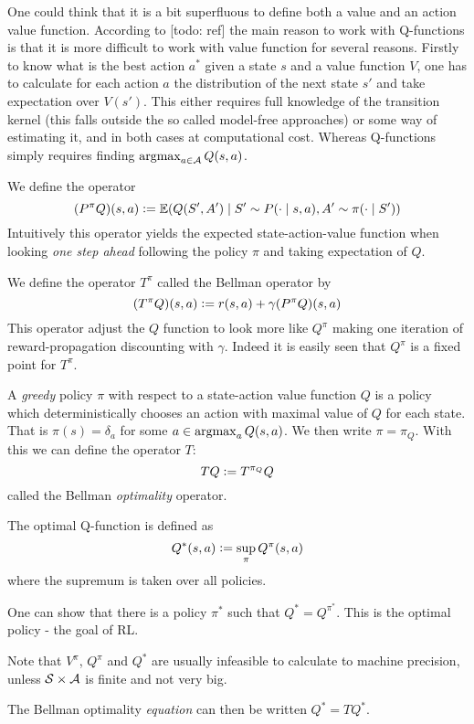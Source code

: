 One could think that it is a bit superfluous to define both a value and an
action value function. 
According to [todo: ref] the main reason to work with Q-functions
is that it is more difficult to work with value function for several reasons.
Firstly to know what is the best action $a^*$ given a state $s$
and a value function $V$, one has to calculate for each action $a$
the distribution of the next state $s'$ and take expectation over
$V(s')$. This either requires full knowledge of the transition kernel
(this falls outside the so called model-free approaches)
or some way of estimating it, and in both cases at computational cost.
Whereas Q-functions simply requires finding
$\operatorname*{argmax}_{a \in \mathcal{A}} Q(s,a)$.

We define the operator
\[ (P^\pi Q)(s, a) \vcentcolon= \mathbb{E} (Q(S', A') \mid S' \sim P(\cdot \mid s, a),
A' \sim \pi(\cdot \mid S')) \]
Intuitively this operator yields the expected state-action-value function
when looking \emph{one step ahead} following the policy $\pi$ and taking
expectation of $Q$.

We define the operator $T^\pi$ called the Bellman operator by
\[ (T^\pi Q)(s, a) \vcentcolon= r(s, a) + \gamma (P^\pi Q)(s, a) \]
This operator adjust the $Q$ function to look more like $Q^\pi$ making one
iteration of reward-propagation discounting with $\gamma$.
Indeed it is easily seen that $Q^\pi$ is a fixed point for $T^\pi$.

A \emph{greedy} policy $\pi$ with respect to a state-action value function $Q$
is a policy which deterministically chooses an action with maximal value of $Q$
for each state.
That is $\pi(s) = \delta_a$ for some $a \in \operatorname*{argmax}_a Q(s,a)$.
We then write $\pi = \pi_Q$. With this we can define the operator $T$:
\[ T Q \vcentcolon= T^{\pi_Q} Q \]
called the Bellman \emph{optimality} operator.

The optimal Q-function is defined as
\[ Q^*(s, a) \vcentcolon= \sup_\pi Q^\pi(s, a) \]
where the supremum is taken over all policies.

One can show that there is a policy $\pi^*$ such that $Q^* = Q^{\pi^*}$.
This is the optimal policy - the goal of RL. 

Note that $V^\pi$, $Q^\pi$ and $Q^*$ are usually infeasible to calculate to
machine precision, unless $\mathcal{S} \times \mathcal{A}$ is finite and not very big.


The Bellman optimality \emph{equation} can then be written $Q^* = TQ^*$.



